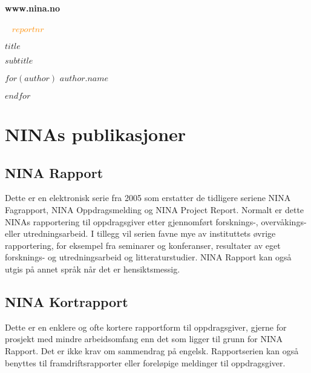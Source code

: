 \documentclass[11pt, a4paper]{article}
\newcommand{\shadOrange}[1]{\textcolor{lightOrange}{#1}}
\newcommand{\orange}[1]{\textcolor{darkOrange}{#1}}
\newcommand{\darkGrey}[1]{\textcolor{darkgrey}{#1}}
\begin{document}
\begin{titlepage}

\thispagestyle{titlefooter}
\begin{center}
\vspace{-1cm}
\Large\shadOrange{\textbf{www.nina.no}}
\end{center}
\vspace{2cm}

\Huge{\darkGrey{~}} \hspace{.7cm} \textbf{\orange{$reportnr$}}
\vspace{2cm}

\Huge{$title$} \par\vspace{.5cm}
\huge{$subtitle$} \par\vspace{1cm}

$for(author)$
\LARGE{$author.name$} \par
$endfor$

\restoregeometry
\end{titlepage}
\cfoot{}

\section*{NINAs publikasjoner}


\subsection*{\normalsize{NINA Rapport}}
{\small Dette er en elektronisk serie fra 2005 som erstatter de tidligere seriene NINA Fagrapport, NINA Oppdragsmelding og NINA Project Report. Normalt er dette NINAs rapportering til oppdragsgiver etter gjennomført forsknings\hyp{}, overvåkings\hyp{} eller utredningsarbeid. I tillegg vil serien favne mye av instituttets øvrige rapportering, for eksempel fra seminarer og konferanser, resultater av eget forsknings\hyp{} og utredningsarbeid og litteraturstudier. NINA Rapport kan også utgis på annet språk når det er hensiktsmessig.}

\subsection*{\normalsize{NINA Kortrapport}}
{\small Dette er en enklere og ofte kortere rapportform til oppdragsgiver, gjerne for prosjekt med mindre arbeidsomfang enn det som ligger til grunn for NINA Rapport. Det er ikke krav om sammendrag på engelsk. Rapportserien kan også benyttes til framdriftsrapporter eller foreløpige meldinger til oppdragsgiver.}
\end{document}
